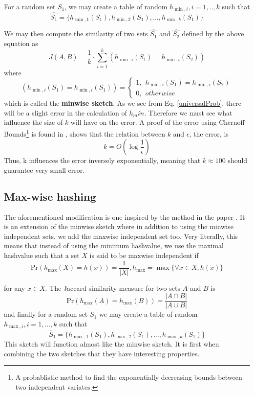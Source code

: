 \documentclass[../../main.tex]{subfiles}
\begin{document}
For a random set $S_1$, we may create a table of random $h_{\min,i},i=1,..,k$ such that
$$
\hat{S_1} = \{ h_{\min,1}(S_1),h_{\min,2}(S_1),...,h_{\min,k}(S_1)\}
$$

We may then compute the similarity of two sets $\hat{S_1}$ and $\hat{S_2}$ defined by the above equation as
\begin{equation}\label{jacsketch}
J(A,B)=\frac{1}{k}\cdot \sum_{i=1}^k (h_{\min,i}(S_1) = h_{\min,i}(S_2))
\end{equation}
where
$$
(h_{\min,i}(S_1) = h_{\min,i}(S_1)) = \left\{ \begin{array}{ll}
												1, \ \ h_{\min,i}(S_1)=h_{\min,i}(S_2)\\
												0, \ \ otherwise
											  \end{array}\right.
$$
which is called the \textbf{minwise sketch}. As we see from Eq. \ref{universalProb}, there will be a slight error in the calculation of $h_min$. Therefore we must see what influence the size of $k$ will have on the error. A proof of the error using Chernoff Bounds\footnote{A probablistic method to find the exponentially decreasing bounds between two independent variates.} is found in \cite{errorMinhash}, shows that the relation between $k$ and $\epsilon$, the error, is 
$$
k=O\left(\log \frac{1}{\epsilon}\right)
$$
Thus, k influences the error inversely exponentially, meaning that $k\approx 100$ should guarantee very small error.

\subsection{Max-wise hashing}

The aforementioned modification is one inspired by the method in the paper \cite{minmaxhash}. It is an extension of the minwise sketch where in addition to using the minwise independent sets, we add the maxwise independent set too. Very literally, this means that instead of using the minimum hashvalue, we use the maximal hashvalue such that a set $X$ is said to be maxwise independent if
\begin{equation}\label{maxwise}
\mathrm{Pr}(h_{\max}(X)=h(x))=\frac{1}{|X|}, h_{\max}=\max\{\forall x \in X, h(x)\} 
\end{equation}

for any $x\in X$. The Jaccard similarity measure for two sets $A$ and $B$ is
\begin{equation}\label{maxwisejaccard}
\mathrm{Pr}(h_{\max}(A)=h_{\max}(B))=\frac{|A\cap B|}{|A\cup B|}
\end{equation}
and finally for a random set $S_1$ we may create a table of random $h_{\max,i},i=1,...,k$ such that
$$
\tilde{S_1} = \{ h_{\max,1}(S_1),h_{\max,2}(S_1),...,h_{\max,k}(S_1)\}
$$
This sketch will function almost like the minwise sketch. It is first when combining the two sketches that they have interesting properties.
\end{document}
